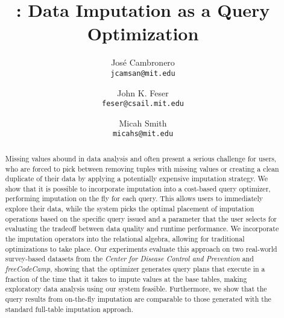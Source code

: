 \documentclass{vldb}
\title{\ProjectName{}: Data Imputation as a Query Optimization}
\author{
  Jos\'e Cambronero \\
  \texttt{jcamsan@mit.edu}
  \and
  John K. Feser \\
  \texttt{feser@csail.mit.edu}
  \and
  Micah Smith \\
  \texttt{micahs@mit.edu}}
\begin{document}
\maketitle

\begin{abstract}
Missing values abound in data analysis and often present a serious challenge for users, who
are forced to pick between removing tuples with missing values or creating a clean duplicate of their data
by  applying a potentially expensive imputation strategy. We show that it is possible
to incorporate imputation into a cost-based query optimizer, performing imputation on the fly
for each query. This allows users to immediately explore
their data, while the system picks the optimal placement of imputation operations based
on the specific query issued and a parameter that the user selects for evaluating the tradeoff between data
quality and runtime performance. We incorporate the imputation operators into the relational algebra, allowing
for traditional optimizations to take place. Our experiments evaluate this approach on two real-world survey-based datasets
from the \textit{Center for Disease Control and Prevention} and \textit{freeCodeCamp}, showing that the 
optimizer generates query plans that execute in a fraction of the time that it takes to impute values at the base
tables, making exploratory data analysis using our system feasible. Furthermore, we show that the query results
from on-the-fly imputation are comparable to those generated with the standard full-table imputation approach.
\end{abstract}







\balance
\nocite{*}
\printbibliography
\end{document}
